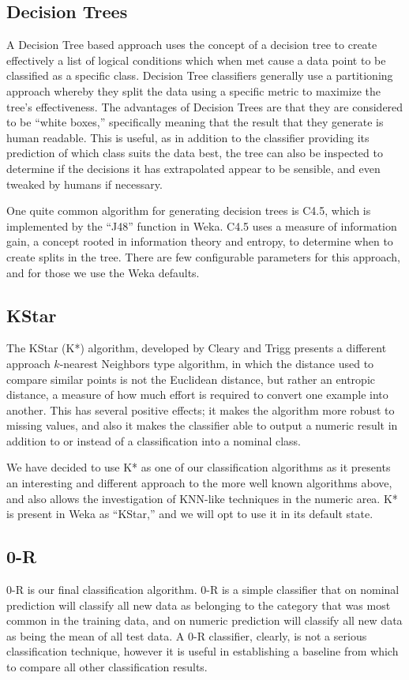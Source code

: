 \documentclass[../thesis/thesis.tex]{subfiles}
\begin{document}
\subsection{Decision Trees}
A Decision Tree based approach uses the concept of a decision tree to create effectively a list of logical conditions which when met cause a data point to be classified as a specific class. Decision Tree classifiers generally use a partitioning approach whereby they split the data using a specific metric to maximize the tree's effectiveness. The advantages of Decision Trees are that they are considered to be ``white boxes,'' specifically meaning that the result that they generate is human readable. This is useful, as in addition to the classifier providing its prediction of which class suits the data best, the tree can also be inspected to determine if the decisions it has extrapolated appear to be sensible, and even tweaked by humans if necessary.

One quite common algorithm for generating decision trees is C4.5, which is implemented by the ``J48'' function in Weka. C4.5 uses a measure of information gain, a concept rooted in information theory and entropy, to determine when to create splits in the tree. There are few configurable parameters for this approach, and for those we use the Weka defaults.

\subsection{KStar}
The KStar (K*) algorithm, developed by Cleary and Trigg \cite{cleary1995k} presents a different approach $k$-nearest Neighbors type algorithm, in which the distance used to compare similar points is not the Euclidean distance, but rather an entropic distance, a measure of how much effort is required to convert one example into another. This has several positive effects; it makes the algorithm more robust to missing values, and also it makes the classifier able to output a numeric result in addition to or instead of a classification into a nominal class.

We have decided to use K* as one of our classification algorithms as it presents an interesting and different approach to the more well known algorithms above, and also allows the investigation of KNN-like techniques in the numeric area. K* is present in Weka as ``KStar,'' and we will opt to use it in its default state.

\subsection{0-R}
0-R is our final classification algorithm. 0-R is a simple classifier that on nominal prediction will classify all new data as belonging to the category that was most common in the training data, and on numeric prediction will classify all new data as being the mean of all test data. A 0-R classifier, clearly, is not a serious classification technique, however it is useful in establishing a baseline from which to compare all other classification results.
\end{document}
